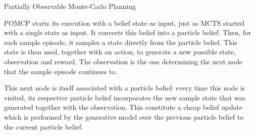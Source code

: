 \begin{algorithm}
    \caption{Partially Observable Monte-Carlo Planning}
\begin{multicols}{2}


    \setcounter{AlgoLine}{0}

    \setcounter{AlgoLine}{0}

\end{multicols}
\end{algorithm}

POMCP starts its execution with a belief state as input, just as MCTS started with a single state as
input. It converts this belief into a particle belief. Then, for each sample episode, it samples a
state directly from the particle belief. This state is then used, together with an action, to
generate a new possible state, observation and reward. The observation is the one determining the
next node that the sample episode continues to.

This next node is itself associated with a particle belief: every time this node is visited, its
respective particle belief incorporates the new sample state that was generated together with the
observation. This constitute a cheap belief update which is performed by the generative model over
the previous particle belief to the current particle belief.

